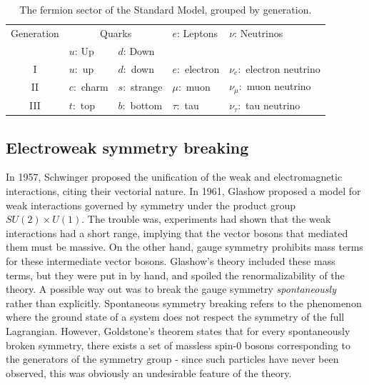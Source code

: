 \begin{table}
  \raggedright
\strictpagecheck
\begin{adjustwidth*}{0in}{-0.5in}
  \begin{tabular}{cllll}
    \toprule
    Generation & \multicolumn{2}{c}{Quarks} & $e$: Leptons & $\nu$: Neutrinos \\ \cmidrule(r){2-3}
     & $u$: Up & $d$: Down &                                       & \\\midrule
    I           & $u:$ up                    & $d:$ down     & $e:$ electron                         & $\nu_e:$ electron neutrino\\
    II          & $c:$ charm                 & $s:$ strange  & $\mu:$ muon                           & $\nu_\mu:$ muon neutrino\\
    III         & $t:$ top                   & $b:$ bottom   & $\tau:$ tau                           & $\nu_\tau:$ tau neutrino\\
    \bottomrule
  \end{tabular}
  \caption{The fermion sector of the Standard Model, grouped by generation.}
  \label{tab:fermion_generations}
\end{adjustwidth*}
\end{table}
\subsection{Electroweak symmetry breaking}\label{subsec:ewsb}
In 1957, Schwinger proposed the unification of the weak and electromagnetic interactions, citing their vectorial nature. In 1961, Glashow proposed a model for weak interactions governed by symmetry under the product group $SU(2)\times U(1)$. The trouble was, experiments had shown that the weak interactions had a short range, implying that the vector bosons that mediated them must be massive. On the other hand, gauge symmetry prohibits mass terms for these intermediate vector bosons. Glashow's theory included these mass terms, but they were put in by hand, and spoiled the renormalizability of the theory. A possible way out was to break the gauge symmetry \emph{spontaneously} rather than explicitly. Spontaneous symmetry breaking refers to the phenomenon where the ground state of a system does not respect the symmetry of the full Lagrangian. However, Goldstone's theorem states that for every spontaneously broken symmetry, there exists a set of massless spin-0 bosons corresponding to the generators of the symmetry group - since such particles have never been observed, this was obviously an undesirable feature of the theory. 

